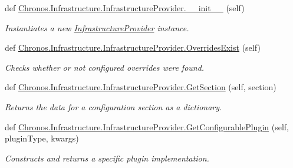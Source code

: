 \begin{DoxyCompactItemize}
\item 
def \hyperlink{group__Chronos_gafcca7af6894603b63cf1340ea78429df}{Chronos.\+Infrastructure.\+Infrastructure\+Provider.\+\_\+\+\_\+init\+\_\+\+\_\+} (self)
\begin{DoxyCompactList}\small\item\em Instantiates a new \hyperlink{classChronos_1_1Infrastructure_1_1InfrastructureProvider}{Infrastructure\+Provider} instance. \end{DoxyCompactList}\item 
def \hyperlink{group__Chronos_ga747229914c9f0788c88c3ba985224dcb}{Chronos.\+Infrastructure.\+Infrastructure\+Provider.\+Overrides\+Exist} (self)
\begin{DoxyCompactList}\small\item\em Checks whether or not configured overrides were found. \end{DoxyCompactList}\item 
def \hyperlink{group__Chronos_ga5ff90b1f8833a5d3b527fc0a746e088d}{Chronos.\+Infrastructure.\+Infrastructure\+Provider.\+Get\+Section} (self, section)
\begin{DoxyCompactList}\small\item\em Returns the data for a configuration section as a dictionary. \end{DoxyCompactList}\item 
def \hyperlink{group__Chronos_ga5793a6dd67790fc5c73518eb71ec93ab}{Chronos.\+Infrastructure.\+Infrastructure\+Provider.\+Get\+Configurable\+Plugin} (self, plugin\+Type, kwargs)
\begin{DoxyCompactList}\small\item\em Constructs and returns a specific plugin implementation. \end{DoxyCompactList}\end{DoxyCompactItemize}
